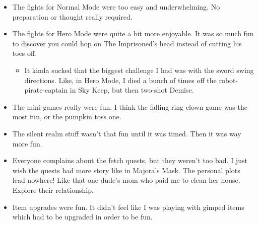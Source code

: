 




\newpage
{}

\begin{itemize}
	\item{The fights for Normal Mode were too easy and underwhelming. No preparation or thought really required.}
	\item{The fights for Hero Mode were quite a bit more enjoyable. It was so much fun to discover you could hop on The Imprisoned's head instead of cutting his toes off.
		\begin{itemize}
			\item{It kinda sucked that the biggest challenge I had was with the sword swing directions. Like, in Hero Mode, I died a bunch of times off the robot-pirate-captain in Sky Keep, but then two-shot Demise.}
		\end{itemize}
	}
 \item{The mini-games really were fun. I think the falling ring clown game was the most fun, or the pumpkin toss one.}
 \item{The silent realm stuff wasn't that fun until it was timed. Then it was way more fun.}
 \item{Everyone complains about the fetch quests, but they weren't too bad. I just wish the 
	quests had more story like in Majora's Mask. The personal plots lead nowhere! Like
	that one dude's mom who paid me to clean her house. Explore their relationship.}
 \item{Item upgrades were fun. It didn't feel like I was playing with gimped items which
	had to be upgraded in order to be fun.}
\end{itemize}


